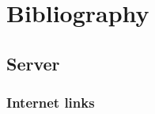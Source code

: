 \chapter*{Bibliography}

\section{Server}
\subsection{Internet links}
\paragraph{}
\begin{description}
\item \textnormal{}
\item \textnormal{}
\end{description}
